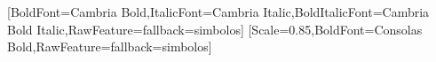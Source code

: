 \setmainfont{Cambria}[BoldFont={Cambria Bold},ItalicFont={Cambria Italic},BoldItalicFont={Cambria Bold Italic},RawFeature={fallback=simbolos}]
\setmonofont{Consolas}[Scale=0.85,BoldFont={Consolas Bold},RawFeature={fallback=simbolos}]
\usepackage{fvextra}
